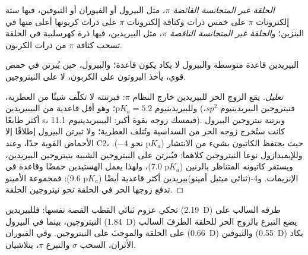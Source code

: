 \begin{definition}\label{def:b3:heterocycles:pi-character}
\emph{الحلقة غير المتجانسة الفائضة $\pi$}، مثل
البيرول أو الفيوران أو الثيوفين، فيها ستة إلكترونات $\pi$ على خمس ذرات وكثافة
إلكترونات $\pi$ على ذرات كربونها أعلى منها في البنزين؛ و\emph{الحلقة غير المتجانسة الناقصة
$\pi$}، مثل البيريدين، فيها
ذرة كهرسلبية في الحلقة تسحب كثافة $\pi$ من ذرات الكربون.
\end{definition}

\begin{proposition}[القاعدية]\label{prop:b3:heterocycles:basicity}
البيريدين قاعدة متوسطة والبيرول لا يكاد يكون قاعدة؛ والبيرول، حين
يُبرتن في حمض قوي، يأخذ البروتون على الكربون، لا على النيتروجين.
\end{proposition}

\begin{proof}[تعليل]
يقع الزوج الحر للبيريدين خارج النظام $\pi$: فبرتنته لا تكلّف شيئًا من
العطرية، وللبيريدينيوم $\mathrm pK_a = 5.2$؛ وهو أقل قاعدية من البيبيريدين
(فنيتروجين البيريدينيوم $sp^2$، أكثر طابعًا s، فيمسك زوجه
بقوة أكبر: البيبيريدينيوم 11.1). وبرتنة نيتروجين البيرول كانت ستُخرج زوجه
الحر من السداسية وتُتلف العطرية؛ ولا تبرتن البيرول إطلاقًا إلا الأحماض القوية جدًا،
وعند C2، حيث يحتفظ الكاتيون بشيء من الانتشار
($\mathrm pK_a$ نحو $-4$). وللإيميدازول نوعا النيتروجين كلاهما: فيُبرتن على
النيتروجين الشبيه بنيتروجين البيريدين، ويستقر كاتيونه المتناظر بالرنين ($\mathrm pK_a$
7.0)، ولهذا يعمل الهستيدين حمضًا وقاعدة في الإنزيمات.
و4-(ثنائي ميثيل أمينو)بيريدين أكثر قاعدية أيضًا ($\mathrm pK_a$ 9.6): فمجموعة الأمينو تدفع
زوجها الحر في الحلقة نحو نيتروجين الحلقة.
\end{proof}

تحكي عزوم ثنائي القطب القصة نفسها: فللبيريدين (\qty{2.19}{D}) طرفه السالب
على النيتروجين، بينما في البيرول (\qty{1.84}{D}) يضع التبرع بالزوج الحر للحلقة
الطرفَ السالب على الحلقة والموجبَ على النيتروجين. وفي الفيوران
(\qty{0.66}{D}) والثيوفين (\qty{0.55}{D}) يكاد الأثران، السحب $\sigma$ والتبرع $\pi$،
يتلاشيان.

